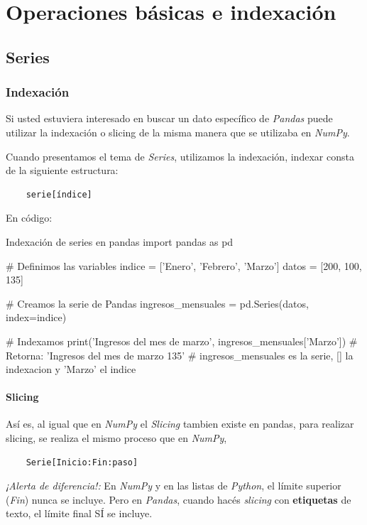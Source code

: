 \section{Operaciones básicas e indexación}

\subsection{Series}

\subsubsection{Indexación}

Si usted estuviera interesado en buscar un dato específico de \textit{Pandas} puede utilizar la indexación o slicing de la misma manera que se utilizaba en \textit{NumPy}.

Cuando presentamos el tema de \textit{Series}, utilizamos la indexación, indexar consta de la siguiente estructura:
\begin{verbatim}
    serie[índice]
\end{verbatim}
En código:
\begin{pycode}{Indexación de series en pandas}
import pandas as pd

# Definimos las variables
indice = ['Enero', 'Febrero', 'Marzo']
datos = [200, 100, 135]

# Creamos la serie de Pandas
ingresos_mensuales = pd.Series(datos, index=indice) 

# Indexamos
print('Ingresos del mes de marzo', ingresos_mensuales['Marzo']) # Retorna: 'Ingresos del mes de marzo 135'
# ingresos_mensuales es la serie, [] la indexacion y 'Marzo' el indice
\end{pycode}

\paragraph{Slicing}
Así es, al igual que en \textit{NumPy} el \textit{Slicing} tambien existe en pandas, para realizar slicing, se realiza el mismo proceso que en \textit{NumPy}, 
\begin{verbatim}
    Serie[Inicio:Fin:paso]
\end{verbatim}

\begin{nota}
    \textit{¡Alerta de diferencia!:} En \textit{NumPy} y en las listas de \textit{Python}, el límite superior (\textit{Fin}) nunca se incluye. Pero en \textit{Pandas}, cuando hacés \textit{slicing} con \textbf{etiquetas} de texto, el límite final SÍ se incluye.
\end{nota}

